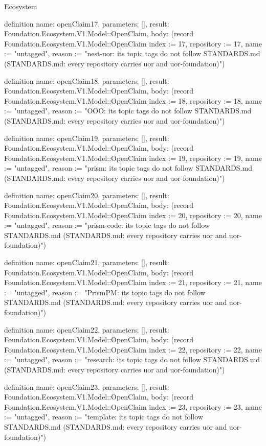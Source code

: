 \begin{lexlean}{Ecosystem}
\begin{semanticmodule}
definition{
  name: openClaim17,
  parameters: [],
  result: Foundation.Ecosystem.V1.Model::OpenClaim,
  body: (record Foundation.Ecosystem.V1.Model::OpenClaim {index := 17, repository := 17, name := "untagged", reason := "nest-uor: its topic tags do not follow STANDARDS.md (STANDARDS.md: every repository carries uor and uor-foundation)"})
}

definition{
  name: openClaim18,
  parameters: [],
  result: Foundation.Ecosystem.V1.Model::OpenClaim,
  body: (record Foundation.Ecosystem.V1.Model::OpenClaim {index := 18, repository := 18, name := "untagged", reason := "OOO: its topic tags do not follow STANDARDS.md (STANDARDS.md: every repository carries uor and uor-foundation)"})
}

definition{
  name: openClaim19,
  parameters: [],
  result: Foundation.Ecosystem.V1.Model::OpenClaim,
  body: (record Foundation.Ecosystem.V1.Model::OpenClaim {index := 19, repository := 19, name := "untagged", reason := "prism: its topic tags do not follow STANDARDS.md (STANDARDS.md: every repository carries uor and uor-foundation)"})
}

definition{
  name: openClaim20,
  parameters: [],
  result: Foundation.Ecosystem.V1.Model::OpenClaim,
  body: (record Foundation.Ecosystem.V1.Model::OpenClaim {index := 20, repository := 20, name := "untagged", reason := "prism-code: its topic tags do not follow STANDARDS.md (STANDARDS.md: every repository carries uor and uor-foundation)"})
}

definition{
  name: openClaim21,
  parameters: [],
  result: Foundation.Ecosystem.V1.Model::OpenClaim,
  body: (record Foundation.Ecosystem.V1.Model::OpenClaim {index := 21, repository := 21, name := "untagged", reason := "PrismPM: its topic tags do not follow STANDARDS.md (STANDARDS.md: every repository carries uor and uor-foundation)"})
}

definition{
  name: openClaim22,
  parameters: [],
  result: Foundation.Ecosystem.V1.Model::OpenClaim,
  body: (record Foundation.Ecosystem.V1.Model::OpenClaim {index := 22, repository := 22, name := "untagged", reason := "research: its topic tags do not follow STANDARDS.md (STANDARDS.md: every repository carries uor and uor-foundation)"})
}

definition{
  name: openClaim23,
  parameters: [],
  result: Foundation.Ecosystem.V1.Model::OpenClaim,
  body: (record Foundation.Ecosystem.V1.Model::OpenClaim {index := 23, repository := 23, name := "untagged", reason := "template: its topic tags do not follow STANDARDS.md (STANDARDS.md: every repository carries uor and uor-foundation)"})
}


\end{semanticmodule}
\end{lexlean}
